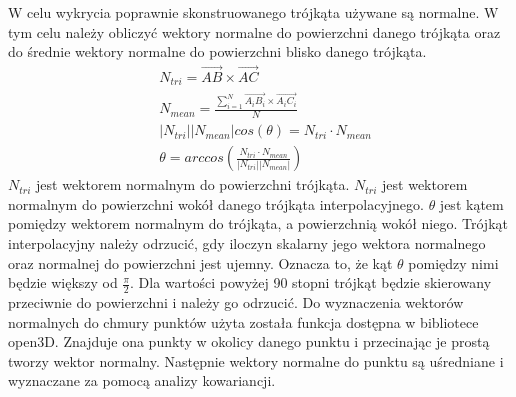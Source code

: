 W celu wykrycia poprawnie skonstruowanego trójkąta używane są normalne. W tym celu należy obliczyć wektory normalne do powierzchni danego trójkąta oraz do średnie wektory normalne do powierzchni blisko danego trójkąta. 
\begin{equation}
    \begin{aligned}
            &N_{tri}=\vec{AB} \times \vec{AC}\\
            &N_{mean}=\frac{\sum_{i=1}^{N} \vec{A_{i}B_{i}} \times \vec{A_{i}C_{i}}}{N}\\
            & |N_{tri}||N_{mean}|cos(\theta)=N_{tri} \cdot N_{mean}\\
            &\theta=arccos(\frac{N_{tri} \cdot N_{mean}}{|N_{tri}||N_{mean}|})

    \end{aligned}
\end{equation}
$N_{tri}$ jest wektorem normalnym do powierzchni trójkąta. $N_{tri}$ jest wektorem normalnym do powierzchni wokół danego trójkąta interpolacyjnego. $\theta$ jest kątem pomiędzy wektorem normalnym do trójkąta, a powierzchnią wokół niego. 
\newline \indent Trójkąt interpolacyjny należy odrzucić, gdy iloczyn skalarny jego wektora normalnego oraz normalnej do powierzchni jest ujemny. Oznacza to, że kąt $\theta$ pomiędzy nimi będzie większy od $\frac{\pi}{2}$. Dla wartości powyżej 90 stopni trójkąt będzie skierowany przeciwnie do powierzchni i należy go odrzucić. Do wyznaczenia wektorów normalnych do chmury punktów użyta została funkcja dostępna w bibliotece open3D. Znajduje ona punkty w okolicy danego punktu i przecinając je prostą tworzy wektor normalny. Następnie wektory normalne do punktu są uśredniane i wyznaczane za pomocą analizy kowariancji.
